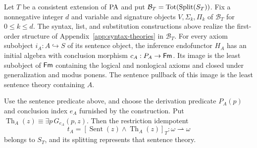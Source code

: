 \begin{theorem}\label{thm:syntactic-generated-theory}
Let $T$ be a consistent extension of $\mathrm{PA}$ and put
$\mathcal B_T=\operatorname{Tot}(\operatorname{Split}(S_T))$. Fix a nonnegative integer $d$
and variable and signature objects $V,\Sigma_k,\Pi_k$ of
$\mathcal B_T$ for $0\leq k\leq d$.
The syntax, list, and substitution constructions above realize
the first-order structure of Appendix~\ref{app:syntax-theories}
in $\mathcal B_T$. For every axiom subobject $i_A:A\hookrightarrow S$
of its sentence object, the inference endofunctor $H_A$ has an
initial algebra with conclusion morphism $c_A:P_A\to\mathsf{Fm}$.
Its image is the least subobject of $\mathsf{Fm}$ containing the logical
and nonlogical axioms and closed under generalization and modus
ponens. The sentence pullback of this image is the least sentence
theory containing $A$.

Use the sentence predicate above, and choose the derivation
predicate $P_A(p)$ and conclusion index $e_A$ furnished by the
construction. Put $\operatorname{Th}_A(z)\equiv\exists p\,G_{e_A}(p,z)$.
Then the restriction idempotent
\[
 t_A=[\operatorname{Sent}(z)\land\operatorname{Th}_A(z)]_T:
                  \omega\rightharpoonup\omega
\]
belongs to $S_T$, and its splitting represents that sentence theory.
\end{theorem}
